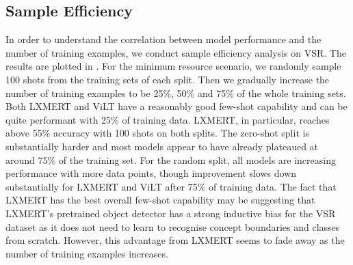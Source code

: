 \subsection{Sample Efficiency}\label{sec:sample_efficiency}
In order to understand the correlation between model performance and the number of training examples, we conduct sample efficiency analysis on VSR. The results are plotted in . For the minimum resource scenario, we randomly sample 100 shots from the training sets of each split. Then we gradually increase the number of training examples to be 25\%, 50\% and 75\% of the whole training sets. 
Both LXMERT and ViLT have a reasonably good few-shot capability and can be quite performant with 25\% of training data. LXMERT, in particular, reaches above 55\% accuracy with 100 shots on both splits.
The zero-shot split is substantially harder and most models appear to have already plateaued at around 75\% of the training set. For the random split, all models are increasing performance with more data points, though improvement slows down substantially for LXMERT and ViLT after 75\% of training data. The fact that LXMERT has the best overall few-shot capability may be suggesting that LXMERT's pretrained object detector has a strong inductive bias for the VSR dataset as it does not need to learn to recognise concept boundaries and classes from scratch. However, this advantage from LXMERT seems to fade away as the number of training examples increases. 




